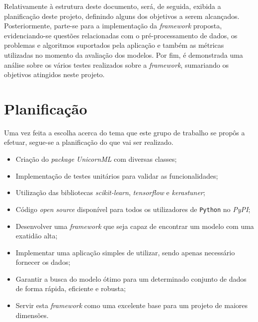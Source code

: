 \documentclass[a4paper]{report}
\begin{document}
{	Relativamente à estrutura deste documento, será, de seguida, exibida a planificação deste projeto, definindo alguns dos objetivos a serem alcançados.
	Posteriormente, parte-se para a implementação da \textit{framework} proposta, evidenciando-se questões relacionadas com o pré-processamento de dados, os problemas e algoritmos suportados pela aplicação e também as métricas utilizadas no momento da avaliação dos modelos.
	Por fim, é demonstrada uma análise sobre os vários testes realizados sobre a \textit{framework}, sumariando os objetivos atingidos neste projeto.
}

\chapter{Planificação} \label{ch:Planning}
\large {
	Uma vez feita a escolha acerca do tema que este grupo de trabalho se propôs a efetuar, segue-se a planificação do que vai ser realizado.
	\begin{itemize}
		\item Criação do \textit{package} \textsl{UnicornML} com diversas classes;
		\item Implementação de testes unitários para validar as funcionalidades;
		\item Utilização das bibliotecas \textit{scikit-learn}, \textit{tensorflow} e \textit{kerastuner};
		\item Código \textit{open source} disponível para todos os utilizadores de \texttt{Python} no \textit{PyPI};
		\item Desenvolver uma \textit{framework} que seja capaz de encontrar um modelo com uma exatidão alta;
		\item Implementar uma aplicação simples de utilizar, sendo apenas necessário fornecer os dados;
		\item Garantir a busca do modelo ótimo para um determinado conjunto de dados de forma rápida, eficiente e robusta;
		\item Servir esta \textit{framework} como uma excelente base para um projeto de maiores dimensões.
	\end{itemize}
}
\end{document}
